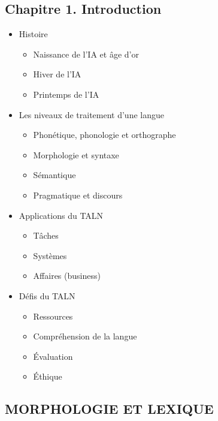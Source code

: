 \documentclass[11pt, a4paper]{article}
\newcommand\repeatstr[1]{\leavevmode\xleaders\hbox{#1}\hfill\kern0pt}
\begin{document}
\begin{tcolorbox}

\subsection*{Chapitre 1. Introduction} %

\begin{multicols}{2}
\begin{itemize}
	\item Histoire
	\begin{itemize}
		\item Naissance de l'IA et âge d'or
		\item Hiver de l'IA
		\item Printemps de l'IA
	\end{itemize}
	\item Les niveaux de traitement d'une langue
	\begin{itemize}
		\item Phonétique, phonologie et orthographe
		\item Morphologie et syntaxe
		\item Sémantique
		\item Pragmatique et discours
	\end{itemize}
	\item Applications du TALN
	\begin{itemize}
		\item Tâches
		\item Systèmes
		\item Affaires (business)
	\end{itemize}
	\item Défis du TALN
	\begin{itemize}
		\item Ressources
		\item Compréhension de la langue
		\item \'Evaluation
		\item \'Ethique
	\end{itemize}
\end{itemize}
\end{multicols}
\end{tcolorbox}

\subsection*{\uppercase{Morphologie et lexique}}
\end{document}
